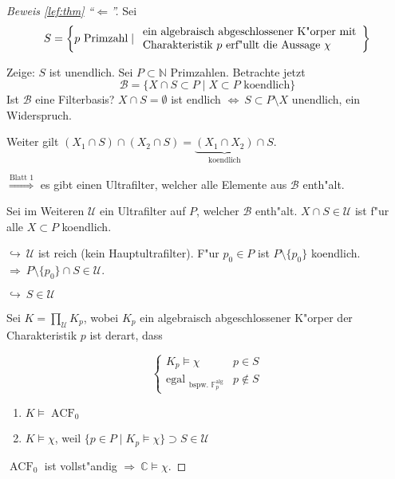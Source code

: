 \documentclass[a4paper,12pt,numbers=noenddot,parskip=full]{scrartcl}
\newcommand{\setN}{\mathbb{N}}
\newcommand{\setC}{\mathbb{C}}
\newcommand{\scrB}{\mathcal{B}}
\newcommand{\scrU}{\mathcal{U}}
\DeclareMathOperator{\acf}{ACF}
\theoremstyle{dotless}
\theoremstyle{remark}
\begin{document}
\begin{proof}[Beweis  \eqref{lef:thm} "`$\Leftarrow$"']
	Sei
	\begin{align*}
		S= \left\{p \text{ Primzahl}\mid 
		\begin{array}{l l}
		\text{ein algebraisch abgeschlossener K"orper mit}\\ 
		\text{Charakteristik } p\text{ erf"ullt die Aussage } \chi  \end{array}\right\}
	\end{align*}
	
	Zeige: $S$ ist unendlich. Sei $P \subset \setN$ Primzahlen. Betrachte jetzt
	\begin{equation}
		\scrB = \{X \cap S \subset P \mid X \subset P \text{ koendlich} \}
	\end{equation}
	Ist $\scrB$ eine Filterbasis? $X \cap S = \emptyset$ ist endlich $\Longleftrightarrow~ S \subset P \setminus X$ unendlich, ein Widerspruch.
	
	Weiter gilt $(X_1 \cap S) \cap (X_2 \cap S) = \underbrace{(X_1 \cap X_2)}_\text{koendlich} \cap S$.
	
	$\overset{\text{Blatt 1}}{\Rightarrow}$ es gibt einen Ultrafilter, welcher alle Elemente aus $\scrB$ enth"alt.
	
	Sei im Weiteren $\scrU$ ein Ultrafilter auf $P$, welcher $\scrB$ enth"alt. $X \cap S \in \scrU$ ist f"ur alle $X \subset P$ koendlich.
	
	$\hookrightarrow~ \scrU$ ist reich (kein Hauptultrafilter). F"ur $p_0 \in P$ ist $P \setminus \{p_0\}$ koendlich. \\$\Rightarrow~P \setminus \{p_0\} \cap S \in \scrU$.
	
	$\hookrightarrow~ S \in \scrU$
	
	Sei $K= \prod\limits_{\scrU} K_p$, wobei $K_p$ ein algebraisch abgeschlossener K"orper der Charakteristik $p$ ist derart, dass
	
	\begin{equation*}
		\begin{cases}
			K_p \models \chi &p \in S\\
			\text{egal }_{\text{bspw. } \mathbb{F}_p^{\text{alg}}} &p \notin S
		\end{cases}	
	\end{equation*}
	\begin{enumerate}
		\item $K \models \acf_0$
		\item $K \models \chi$, weil $\{p \in P \mid K_p \models \chi \} \supset S \in \scrU$
	\end{enumerate}
	$\acf_0$ ist vollst"andig $\Rightarrow~ \setC \models \chi$.
\end{proof}
\end{document}
